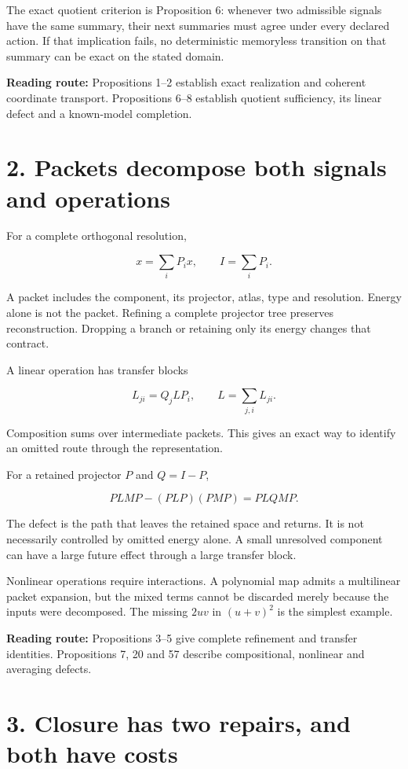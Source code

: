 \documentclass[11pt,letterpaper]{article}
\begin{document}
The exact quotient criterion is Proposition 6: whenever two admissible
signals have the same summary, their next summaries must agree under
every declared action. If that implication fails, no deterministic
memoryless transition on that summary can be exact on the stated domain.

\textbf{Reading route:} Propositions 1--2 establish exact realization
and coherent coordinate transport. Propositions 6--8 establish quotient
sufficiency, its linear defect and a known-model completion.

\section{2. Packets decompose both signals and
operations}\label{packets-decompose-both-signals-and-operations}

For a complete orthogonal resolution,

\[
x=\sum_iP_ix,\qquad I=\sum_iP_i.
\]

A packet includes the component, its projector, atlas, type and
resolution. Energy alone is not the packet. Refining a complete
projector tree preserves reconstruction. Dropping a branch or retaining
only its energy changes that contract.

A linear operation has transfer blocks

\[
L_{ji}=Q_jLP_i,\qquad L=\sum_{j,i}L_{ji}.
\]

Composition sums over intermediate packets. This gives an exact way to
identify an omitted route through the representation.

For a retained projector \(P\) and \(Q=I-P\),

\[
PLMP-(PLP)(PMP)=PLQMP.
\]

The defect is the path that leaves the retained space and returns. It is
not necessarily controlled by omitted energy alone. A small unresolved
component can have a large future effect through a large transfer block.

Nonlinear operations require interactions. A polynomial map admits a
multilinear packet expansion, but the mixed terms cannot be discarded
merely because the inputs were decomposed. The missing \(2uv\) in
\((u+v)^2\) is the simplest example.

\textbf{Reading route:} Propositions 3--5 give complete refinement and
transfer identities. Propositions 7, 20 and 57 describe compositional,
nonlinear and averaging defects.

\section{3. Closure has two repairs, and both have
costs}\label{closure-has-two-repairs-and-both-have-costs}
\end{document}
